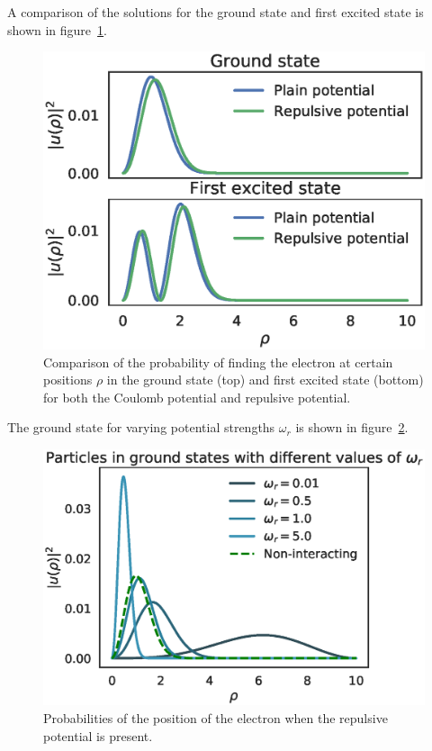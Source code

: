 \documentclass[aps,reprint]{revtex4-1}
\begin{document}
A comparison of the solutions for the ground state and first excited state is
shown in figure~\ref{fig:excitation}.

\begin{figure}[ht]
  \centering
  \includegraphics[width=\columnwidth]{figures/excitation.eps}
  \caption{\label{fig:excitation} Comparison of the probability of finding the
    electron at certain positions \(\rho\) in the ground state (top) and first
    excited state (bottom) for both the Coulomb potential and repulsive potential.}
\end{figure}

The ground state for varying potential strengths $\omega_r$ is shown in figure~\ref{fig:omegas}.

\begin{figure}[ht]
  \centering
  \includegraphics[width=\columnwidth]{figures/omegas.eps}
  \caption{\label{fig:omegas} Probabilities of the position of the electron when
  the repulsive potential is present.}
\end{figure}
\end{document}
